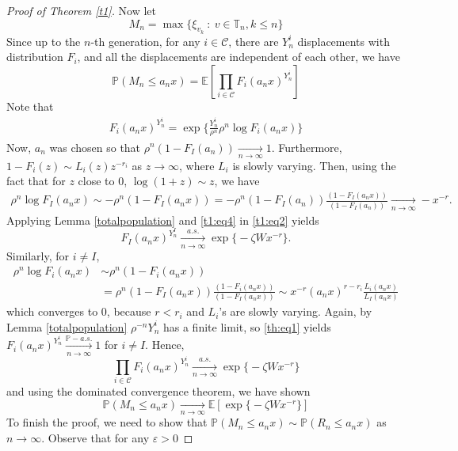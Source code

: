 \documentclass[12pt]{article}
\numberwithin{equation}{section}
\begin{document}
\begin{proof}[Proof of Theorem \ref{t1}]
Now let 
\[
M_n = \max\{\xi_{v_k} \ : \ v \in \mathbb{T}_n, k\leq n\}
\]Since up to the $n$-th generation, for any $i \in \mathcal{C}$, there are $Y^i_n$ displacements with distribution $F_i$, and all the displacements are independent of each other, we have
\[
\mathbb{P}\left(M_n \leq a_n x\right) = \mathbb{E} \left[\prod_{i \in \mathcal{C}} F_i(a_nx)^{Y^i_n}\right]
\]
Note that 
\begin{align}\label{t1:eq2}
    F_i(a_nx)^{Y^i_n} = \exp{\Big\{\frac {Y^i_n} {\rho^n} \rho^n \log F_i(a_n x)\Big\}} 
\end{align}
 Now, $a_n$ was chosen so that $\rho^n (1- F_I(a_n )) \xrightarrow[ n \rightarrow \infty]{}  1$. Furthermore, $1 - F_i(z) \sim L_i(z) z^{-r_i} $ as $z \rightarrow \infty$, where $L_i$ is slowly varying. Then, using the fact that for $z$ close to $0$, $\log(1+z) \sim z$, we have
\begin{align}\label{t1:eq4}
\rho^n \log F_I(a_n x) \sim -\rho^n (1- F_I(a_n x )) = -\rho^n (1- F_I(a_n) ) \frac { (1- F_I(a_n x )) } {(1- F_I(a_n ))} \xrightarrow[ n \rightarrow \infty]{} -x^{-r}.
\end{align}
Applying Lemma \ref{totalpopulation} and \eqref{t1:eq4} in \eqref{t1:eq2} yields\[F_I(a_nx)^{Y^I_n} \xrightarrow[ n \rightarrow \infty]{a.s.}  \exp \big\{ -\zeta W x^{-r} \big\}.\] Similarly, for $i\neq I$,
\begin{equation}
\begin{aligned}\label{th:eq1}
   \rho^n \log F_i(a_n x) &\sim \rho^n (1- F_i(a_n x )) \\&= \rho^n (1- F_I(a_n x) ) \frac { (1- F_i(a_n x )) } {(1- F_I(a_n x ))} \sim x^{-r} (a_n x)^{r - r_i} \frac {L_i(a_n x)} {L_I(a_n x)}
\end{aligned}
\end{equation}
which converges to 0, because $r<r_i$ and $L_i$'s are slowly varying. Again, by Lemma \ref{totalpopulation} $\rho^{-n} Y^i_n$ has a finite limit, so \eqref{th:eq1} yields $F_i(a_nx)^{Y^i_n} \xrightarrow[ n \rightarrow \infty] {\mathbb{P}-a.s.} 1$ for $i\neq I$. Hence,
\[
\prod_{i \in \mathcal{C}} F_i(a_nx)^{Y^i_n} \xrightarrow[ n \rightarrow \infty]{a.s.}  \exp \big\{ -\zeta W x^{-r} \big\}
\]
and using the dominated convergence theorem, we have shown 
\begin{equation}\label{maxdisp}
    \mathbb{P}\left(M_n \leq a_n x\right) \xrightarrow[ n \rightarrow \infty]{} \mathbb{E}\left[ \exp \big\{ - \zeta W x^{-r} \big\}\right]
\end{equation}
To finish the proof, we need to show that $\mathbb{P}\left(M_n \leq a_n x\right) \sim \mathbb{P}\left(R_n \leq a_n x\right)$ as $n\rightarrow \infty$. Observe that for any $\varepsilon > 0$ 

\end{proof}
\end{document}
